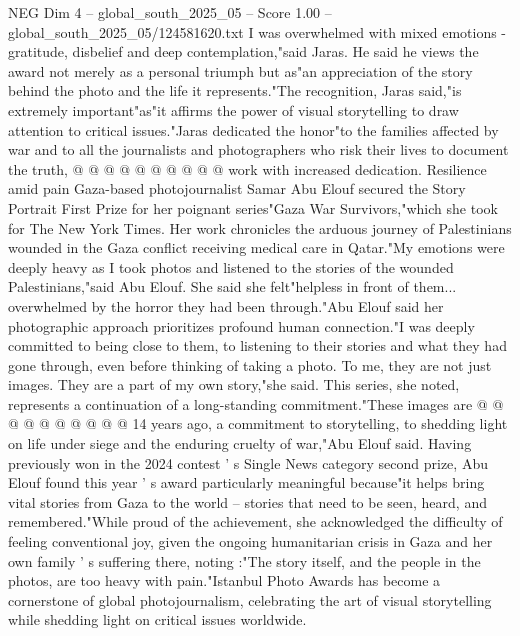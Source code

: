 \begin{textsample}{NEG Dim 4 – global\_south\_2025\_05 – Score 1.00 – global\_south\_2025\_05/124581620.txt}
I was overwhelmed with mixed emotions - gratitude, disbelief and deep contemplation,"said Jaras.
He said he views the award not merely as a personal triumph but as"an appreciation of the story behind the photo and the life it represents."The recognition, Jaras said,"is extremely important"as"it affirms the power of visual storytelling to draw attention to critical issues."Jaras dedicated the honor"to the families affected by war and to all the journalists and photographers who risk their lives to document the truth, @ @ @ @ @ @ @ @ @ @ work with increased dedication.
Resilience amid pain Gaza-based photojournalist Samar Abu Elouf secured the Story Portrait First Prize for her poignant series"Gaza War Survivors,"which she took for The New York Times.
Her work chronicles the arduous journey of Palestinians wounded in the Gaza conflict receiving medical care in Qatar."My emotions were deeply heavy as I took photos and listened to the stories of the wounded Palestinians,"said Abu Elouf.
She said she felt"helpless in front of them... overwhelmed by the horror they had been through."Abu Elouf said her photographic approach prioritizes profound human connection."I was deeply committed to being close to them, to listening to their stories and what they had gone through, even before thinking of taking a photo.
To me, they are not just images.
They are a part of my own story,"she said.
This series, she noted, represents a continuation of a long-standing commitment."These images are @ @ @ @ @ @ @ @ @ @ 14 years ago, a commitment to storytelling, to shedding light on life under siege and the enduring cruelty of war,"Abu Elouf said.
Having previously won in the 2024 contest ' s Single News category second prize, Abu Elouf found this year ' s award particularly meaningful because"it helps bring vital stories from Gaza to the world -- stories that need to be seen, heard, and remembered."While proud of the achievement, she acknowledged the difficulty of feeling conventional joy, given the ongoing humanitarian crisis in Gaza and her own family ' s suffering there, noting :"The story itself, and the people in the photos, are too heavy with pain."Istanbul Photo Awards has become a cornerstone of global photojournalism, celebrating the art of visual storytelling while shedding light on critical issues worldwide.

\end{textsample}
